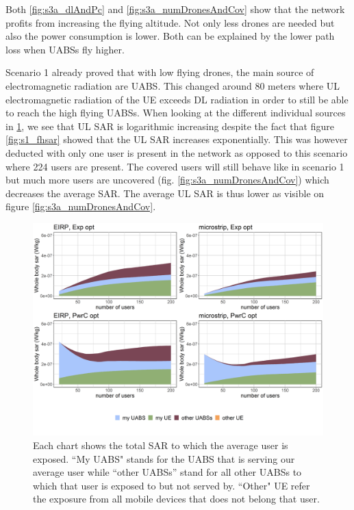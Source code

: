 Both  \ref{fig:s3a_dlAndPc} and \ref{fig:s3a_numDronesAndCov}  show that the network profits from increasing the flying altitude. 
Not only less drones are needed but also the power consumption is lower. Both can be explained by the lower path loss when \gls{UABS}s fly higher.

Scenario 1 already proved that with low flying drones, the main source of electromagnetic radiation are \gls{UABS}. 
This changed around 80 meters where \gls{UL} electromagnetic radiation of the \gls{UE}
exceeds \gls{DL} radiation in order to still be able to reach the high flying \gls{UABS}s. 
When looking at the different individual sources in \ref{fig:s3a_fourSourcesMatrix}, we see 
that \gls{UL} \gls{SAR} is logarithmic increasing despite the fact that figure \ref{fig:s1_fhsar} showed that the  \gls{UL} \gls{SAR} 
increases exponentially. This was however deducted with only one user is present in the network as opposed to this scenario 
where 224 users are present. The covered users will still behave like in scenario 1 but much more users are uncovered (fig. \ref{fig:s3a_numDronesAndCov}) 
which decreases the average \gls{SAR}. The average  \gls{UL} \gls{SAR}  is thus lower as visible on figure \ref{fig:s3a_numDronesAndCov}.

\begin{figure}[]
  \includegraphics[width=\textwidth]{../results/s3/fhFourSources.png}
  \caption{Each chart shows the total SAR to which the average user is exposed. ``My UABS" stands for the UABS that is serving our average user while ``other UABSs'' stand for 
  all other UABSs to which that user is exposed to but not served by. ``Other" UE refer the exposure from all mobile devices that does not belong that user.}
  \label{fig:s3a_fourSourcesMatrix}
\end{figure}

